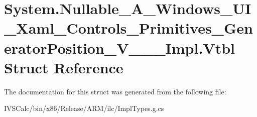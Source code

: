 \hypertarget{struct_system_1_1_nullable___a___windows___u_i___xaml___controls___primitives___generator_position___v_______impl_1_1_vtbl}{}\section{System.\+Nullable\+\_\+\+A\+\_\+\+Windows\+\_\+\+U\+I\+\_\+\+Xaml\+\_\+\+Controls\+\_\+\+Primitives\+\_\+\+Generator\+Position\+\_\+\+V\+\_\+\+\_\+\+\_\+\+Impl.\+Vtbl Struct Reference}
\label{struct_system_1_1_nullable___a___windows___u_i___xaml___controls___primitives___generator_position___v_______impl_1_1_vtbl}


The documentation for this struct was generated from the following file\+:\begin{DoxyCompactItemize}
\item 
I\+V\+S\+Calc/bin/x86/\+Release/\+A\+R\+M/ilc/Impl\+Types.\+g.\+cs\end{DoxyCompactItemize}
